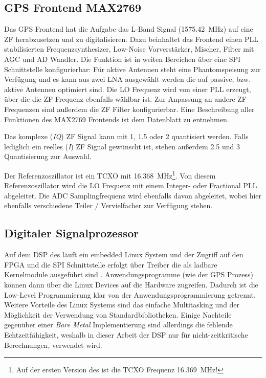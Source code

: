\subsection{GPS Frontend MAX2769}
\label{max2769frontend}
Das GPS Frontend hat die Aufgabe das L-Band Signal (\SI{1575.42}{\MHz}) auf eine \gls{ZF} herabzusetzen und zu digitalisieren. Dazu beinhaltet das Frontend einen PLL stabilisierten Frequenzsynthesizer, Low-Noise Vorverstärker, Mischer, Filter mit \gls{AGC} und AD Wandler. Die Funktion ist in weiten Bereichen über eine SPI Schnittstelle konfigurierbar: Für aktive Antennen steht eine Phantomspeisung zur Verfügung und es kann aus zwei \gls{LNA} ausgewählt werden die auf passive, bzw. aktive Antennen optimiert sind. Die \gls{LO} Frequenz wird von einer PLL erzeugt, über die die ZF Frequenz ebenfalls wählbar ist. Zur Anpassung an andere ZF Frequenzen sind außerdem die ZF Filter konfigurierbar. Eine Beschreibung aller Funktionen des MAX2769 Frontends ist dem Datenblatt \cite{max2769} zu entnehmen.

Das komplexe (\emph{IQ}) ZF Signal kann mit \SI{1}{\bit}, \SI{1.5}{\bit} oder \SI{2}{\bit}  quantisiert werden. Falls lediglich ein reelles (\emph{I}) ZF Signal gewünscht ist, stehen außerdem  \SI{2.5}{\bit} und \SI{3}{\bit} Quantisierung zur Auswahl.

Der Referenzoszillator ist ein \gls{TCXO} mit \SI{16.368}{MHz}\footnote{Auf der ersten Version des \comboard ist die TCXO Frequenz \SI{16.369}{MHz}!}. Von diesem Referenzoszillator wird die LO Frequenz mit einem Integer- oder Fractional PLL abgeleitet. Die ADC Samplingfrequenz wird ebenfalls davon abgeleitet, wobei hier ebenfalls verschiedene Teiler / Vervielfacher zur Verfügung stehen.


\subsection{Digitaler Signalprozessor}
Auf dem \gls{DSP} des \comboard läuft ein embedded Linux System und der Zugriff auf den FPGA und die SPI Schnittstelle erfolgt über Treiber die als ladbare Kernelmodule ausgeführt sind . Anwendungsprogramme (wie der GPS Prozess) können dann über die Linux Devices auf die Hardware zugreifen. Dadurch ist die Low-Level Programmierung klar von der Anwendungsprogrammierung getrennt. Weitere Vorteile des Linux Systems sind das einfache Multitasking und der Möglichkeit der Verwendung von Standardbibliotheken. Einige Nachteile gegenüber einer \emph{Bare Metal} Implementierung sind allerdings die fehlende Echtzeitfähigkeit, weshalb in dieser Arbeit der DSP nur für nicht-zeitkritische Berechnungen, verwendet wird.

